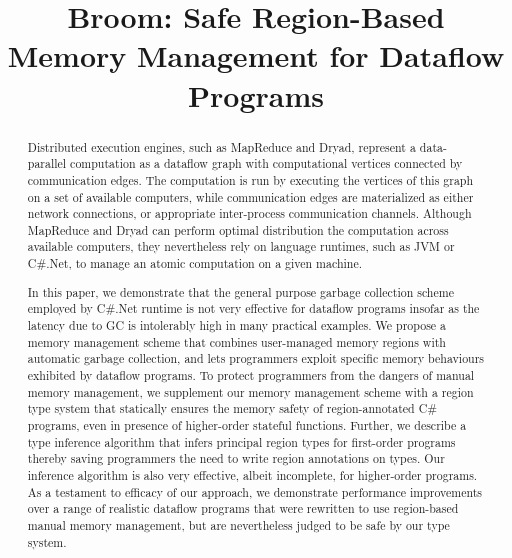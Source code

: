 \documentclass{sigplanconf}
\begin{document}




\title{Broom: Safe Region-Based Memory Management for Dataflow
Programs}

\authorinfo{}
           {}
           {}
\maketitle

\begin{abstract}

Distributed execution engines, such as MapReduce and Dryad, represent
a data-parallel computation as a dataflow graph with computational
vertices connected by communication edges. The computation is run by
executing the vertices of this graph on a set of available computers,
while communication edges are materialized as either network
connections, or appropriate inter-process communication channels.
Although MapReduce and Dryad can perform optimal distribution the
computation across available computers, they nevertheless rely on
language runtimes, such as JVM or C\#.Net, to manage an atomic
computation on a given machine. 

In this paper, we demonstrate that the general purpose garbage
collection scheme employed by C\#.Net runtime is not very effective
for dataflow programs insofar as the latency due to GC is intolerably
high in many practical examples. We propose a memory management scheme
that combines user-managed memory regions with automatic garbage
collection, and lets programmers exploit specific memory behaviours
exhibited by dataflow programs. To protect programmers from the
dangers of manual memory management, we supplement our memory
management scheme with a region type system that statically ensures
the memory safety of region-annotated C\# programs, even in presence
of higher-order stateful functions. Further, we describe a type
inference algorithm that infers principal region types for first-order
programs thereby saving programmers the need to write region
annotations on types. Our inference algorithm is also very effective,
albeit incomplete, for higher-order programs. As a testament to
efficacy of our approach, we demonstrate performance improvements over
a range of realistic dataflow programs that were rewritten to use
region-based manual memory management, but are nevertheless judged to
be safe by our type system.

\end{abstract}
\end{document}
